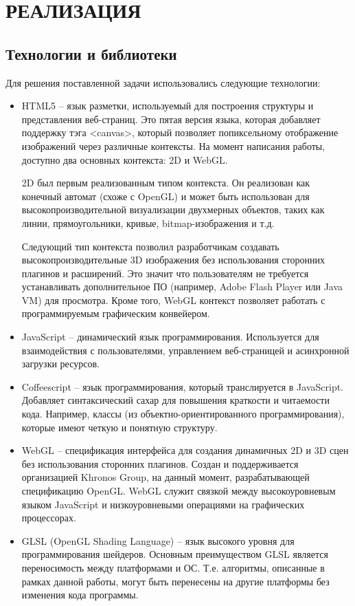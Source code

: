\newpage
\section{РЕАЛИЗАЦИЯ} 

\subsection{Технологии и библиотеки} 

Для решения поставленной задачи использовались следующие технологии:

\begin{itemize} 
  \item HTML5 -- язык разметки, используемый для построения структуры и представления веб-страниц. 
    Это пятая версия языка, которая добавляет поддержку тэга \textless{}canvas\textgreater{}, 
    который позволяет попиксельному отображение изображений через различные контексты. 
    На момент написания работы, доступно два основных контекста: 2D и WebGL.

    2D был первым реализованным типом контекста. Он реализован как конечный автомат (схоже 
    с OpenGL) и может быть использован для высокопроизводительной визуализации двухмерных объектов, 
    таких как линии, прямоугольники, кривые, bitmap-изображения и т.д.

    Следующий тип контекста позволил разработчикам создавать высокопроизводительные 3D изображения 
    без использования сторонних плагинов и расширений. Это значит что пользователям не требуется 
    устанавливать дополнительное ПО (например, Adobe Flash Player или Java VM) для просмотра. 
    Кроме того, WebGL контекст позволяет работать с программируемым графическим конвейером. 

  \item JavaScript -- динамический язык программирования. Используется для взаимодействия с 
    пользователями, управлением веб-страницей и асинхронной загрузки ресурсов.

  \item Coffeescript -- язык программирования, который транслируется в JavaScript. Добавляет 
    синтаксический сахар для повышения краткости и читаемости кода. Например, классы 
    (из объектно-ориентированного программирования), которые имеют четкую и понятную структуру.

  \item WebGL -- спецификация интерфейса для создания динамичных 2D и 3D сцен без использования 
    сторонних плагинов. Создан и поддерживается организацией Khronos Group, на данный момент, 
    разрабатывающей спецификацию OpenGL. WebGL служит связкой между высокоуровневым языком 
    JavaScript и низкоуровневыми операциями на графических процессорах.

  \item GLSL (OpenGL Shading Language) -- язык высокого уровня для программирования шейдеров. 
    Основным преимуществом GLSL является переносимость между платформами и ОС. Т.е. алгоритмы, 
    описанные в рамках данной работы, могут быть перенесены на другие платформы без изменения 
    кода программы.
\end{itemize}

